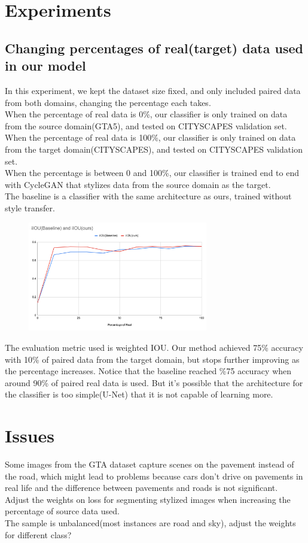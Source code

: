 \documentclass{article}
\begin{document}
\section{Experiments}
\subsection{Changing percentages of real(target) data used in our model}
In this experiment, we kept the dataset size fixed, and only included paired data from both domains, changing the percentage each takes.\\
When the percentage of real data is 0\%, our classifier is only trained on data from the source domain(GTA5), and tested on CITYSCAPES validation set.\\
When the percentage of real data is 100\%, our classifier is only trained on data from the target domain(CITYSCAPES), and tested on CITYSCAPES validation set.\\
When the percentage is between 0 and 100\%, our classifier is trained end to end with CycleGAN that stylizes data from the source domain as the target.\\
The baseline is a classifier with the same architecture as ours, trained without style transfer.\\
\begin{figure}[H]
    \centering
\includegraphics[width=0.7\textwidth]{figures/real_p.png}\\
\end{figure}

The evaluation metric used is weighted IOU. Our method achieved 75\% accuracy with 10\% of paired data from the target domain, but stops further improving as the percentage increases. Notice that the baseline reached \%75 accuracy when around 90\% of paired real data is used. But it's possible that the architecture for the classifier is too simple(U-Net) that it is not capable of learning more.\\

\section*{Issues}
Some images from the GTA dataset capture scenes on the pavement instead of the road, which might lead to problems because cars don't drive on pavements in real life and the difference between pavements and roads is not significant.\\
Adjust the weights on loss for segmenting stylized images when increasing the percentage of source data used.\\
The sample is unbalanced(most instances are road and sky), adjust the weights for different class?


\end{document}
